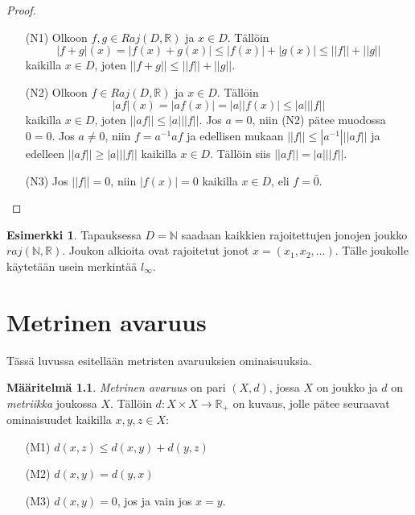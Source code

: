 \documentclass[12pt,a4paper,leqno]{report}
\newcommand{\R}{\mathbb{R}}
\newcommand{\N}{\mathbb{N}}
\theoremstyle{plain}
\theoremstyle{definition}
\newtheorem{maar}[equation]{Määritelmä}
\newtheorem{esim}[equation]{Esimerkki}
\theoremstyle{remark}
\begin{document}
\begin{proof}
\begin{itemize}
\item[(N1)] Olkoon $f,g\in Raj(D,\R )$ ja $x\in D$. Tällöin
\begin{equation*}
|f+g|(x)=|f(x)+g(x)|\leq|f(x)|+|g(x)|\leq||f||+||g||
\end{equation*}
kaikilla $x\in D$, joten $||f+g||\leq||f||+||g||$.

\item[(N2)] Olkoon $f\in Raj(D,\R )$ ja $x\in D$. Tällöin
\begin{equation*}
|af|(x)=|af(x)|=|a||f(x)|\leq|a|||f||
\end{equation*}
kaikilla $x\in D$, joten $||af||\leq|a|||f||$. Jos $a=0$, niin (N2) pätee muodossa $0=0$. %
Jos $a\neq 0$, niin $f=a^{-1}af$ ja edellisen
mukaan $||f||\leq|a^{-1}|||af||$
ja edelleen $||af||\geq|a|||f||$ kaikilla $x\in D$. Tällöin siis $||af||=|a|||f||$.

\item[(N3)]Jos $||f||=0$, niin $|f(x)|=0$ kaikilla $x\in D$, eli  $f=\bar{0}$.
\end{itemize} 
\end{proof}

\begin{esim}
Tapauksessa $D=\N$ saadaan kaikkien rajoitettujen jonojen joukko $raj(\N,\R).$ Joukon alkioita ovat rajoitetut jonot $x=(x_1,x_2,\dots).$ Tälle joukolle käytetään usein merkintää $l_\infty$.

\end{esim}


\chapter{Metrinen avaruus}\label{metrinen}
Tässä luvussa esitellään metristen avaruuksien ominaisuuksia.
\begin{maar} \emph{Metrinen avaruus} 
on pari $(X,d)$, jossa $X$ on joukko ja $d$ on \emph{metriikka} joukossa $X$.
Tällöin $d\colon X\times X\rightarrow \R_+$ on kuvaus, jolle pätee seuraavat ominaisuudet kaikilla $x,y,z\in X$:
\begin{itemize}
\item[(M1)]$d(x,z)\leq d(x,y)+d(y,z)$
\item[(M2)]$d(x,y)=d(y,x)$
\item[(M3)]$d(x,y)=0$, jos ja vain jos $x=y$.
\end{itemize} 
\end{maar} 
\end{document}
